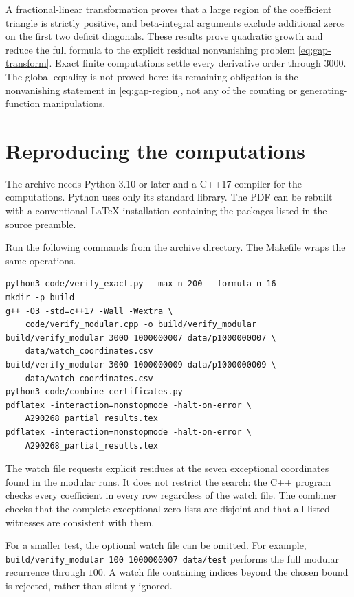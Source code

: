 \documentclass[11pt]{article}
\numberwithin{equation}{section}
\theoremstyle{definition}
\theoremstyle{remark}
\begin{document}
A fractional-linear transformation proves that a large region of the
coefficient triangle is strictly positive, and beta-integral arguments
exclude additional zeros on the first two deficit diagonals. These
results prove quadratic growth and reduce the full formula to the
explicit residual nonvanishing problem \eqref{eq:gap-transform}.
Exact finite computations settle every derivative order through $3000$.
The global equality is not proved here: its remaining obligation is the
nonvanishing statement in \eqref{eq:gap-region}, not any of the counting
or generating-function manipulations.

\appendix
\section{Reproducing the computations}\label{app:reproduce}
The archive needs Python 3.10 or later and a C++17 compiler for the
computations. Python uses only its standard library. The PDF can be
rebuilt with a conventional LaTeX installation containing the packages
listed in the source preamble.

Run the following commands from the archive directory. The Makefile
wraps the same operations.
\begin{lstlisting}
python3 code/verify_exact.py --max-n 200 --formula-n 16
mkdir -p build
g++ -O3 -std=c++17 -Wall -Wextra \
    code/verify_modular.cpp -o build/verify_modular
build/verify_modular 3000 1000000007 data/p1000000007 \
    data/watch_coordinates.csv
build/verify_modular 3000 1000000009 data/p1000000009 \
    data/watch_coordinates.csv
python3 code/combine_certificates.py
pdflatex -interaction=nonstopmode -halt-on-error \
    A290268_partial_results.tex
pdflatex -interaction=nonstopmode -halt-on-error \
    A290268_partial_results.tex
\end{lstlisting}
The watch file requests explicit residues at the seven exceptional
coordinates found in the modular runs. It does not restrict the search:
the C++ program checks every coefficient in every row regardless of the
watch file. The combiner checks that the complete exceptional zero lists
are disjoint and that all listed witnesses are consistent with them.

For a smaller test, the optional watch file can be omitted. For example,
\texttt{build/verify\_modular 100 1000000007 data/test} performs the full
modular recurrence through $100$. A watch file containing indices beyond
the chosen bound is rejected, rather than silently ignored.
\end{document}
